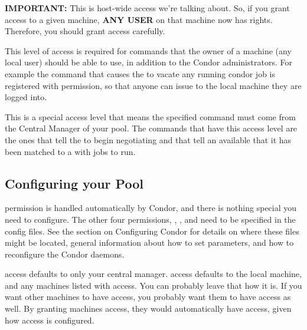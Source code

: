 \begin{description}
   \textbf{IMPORTANT:} This is host-wide access we're talking about.
   So, if you grant  access to a given machine,
   \textbf{ANY USER} on that machine now has 
   rights.  Therefore, you should grant  access
   carefully.

\item[\DCPerm{OWNER}] \label{dcperm:owner} This level of access is
   required for commands that the owner of a machine (any local user)
   should be able to use, in addition to the Condor administrators.
   For example the  command that causes the
    to vacate any running condor job is registered with
    permission, so that anyone can issue 
   to the local machine they are logged into.

\item[\DCPerm{NEGOTIATOR}] \label{dcperm:negotiator} This is a special
   access level that means the specified command must come from the
   Central Manager of your pool.  The commands that have this access
   level are the ones that tell the  to begin
   negotiating and that tell an available  that it has
   been matched to a  with jobs to run.

\end{description}

\subsection{Configuring your Pool}
\label{sec:Config-DCPerms}

 permission is handled automatically by Condor, and
there is nothing special you need to configure.  The other four
permissions, , ,  and
 need to be specified in the config files.  See the
section on Configuring Condor for details on where these files might
be located, general information about how to set parameters, and how
to reconfigure the Condor daemons.

 access defaults to only your central manager.
 access defaults to the local machine, and any machines
listed with  access.  You can probably leave
that how it is.  If you want other machines to have 
access, you probably want them to have  access
as well.  By granting machines  access, they
would automatically have  access, given how
 access is configured.

